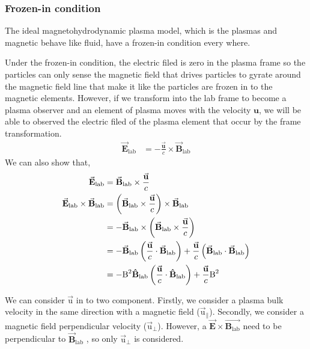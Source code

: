\documentclass[12pt, a4paper]{article}
\DeclareRobustCommand{\uvec}[1]{{%
  \ifcsname uvec#1\endcsname
     \csname uvec#1\endcsname
   \else
    \bm{\hat{\mathbf{#1}}}%
   \fi
}}
\begin{document}
		\subsubsection*{Frozen-in condition}
			The ideal magnetohydrodynamic plasma model, which is the plasmas and magnetic behave like fluid, have a frozen-in condition every where. \par
			Under the frozen-in condition, the electric filed is zero in the plasma frame so the particles can only sense the magnetic field that drives particles to gyrate around the magnetic field line that make it like the particles are frozen in to the magnetic elements. However, if we transform into the lab frame to become a plasma observer and an element of plasma moves with the velocity $\mathbf{u}$, we will be able to observed the electric filed of the plasma element that occur by the frame transformation.
			\begin{align*}
				\vec{\mathbf{E}}_{\text{lab}}&=-\frac{\vec{\mathbf{u}}}{c}\times\vec{\mathbf{B}}_{\text{lab}}
			\end{align*}
			We can also show that,
			\begin{align*}
				\vec{\mathbf{E}}_{\text{lab}}&=\vec{\mathbf{B}}_{\text{lab}}\times\frac{\vec{\mathbf{u}}}{c}\\
				\vec{\mathbf{E}}_{\text{lab}}\times\vec{\mathbf{B}}_{\text{lab}}&=\left( \vec{\mathbf{B}}_{\text{lab}}\times\frac{\vec{\mathbf{u}}}{c}\right) \times\vec{\mathbf{B}}_{\text{lab}}\\
				&=-\vec{\mathbf{B}}_{\text{lab}}\times\left( \vec{\mathbf{B}}_{\text{lab}}\times\frac{\vec{\mathbf{u}}}{c}\right)\\
				&=-\vec{\mathbf{B}}_{\text{lab}}\left( \frac{\vec{\mathbf{u}}}{c}\cdot \vec{\mathbf{B}}_{\text{lab}} \right)+\frac{\vec{\mathbf{u}}}{c}\left( \vec{\mathbf{B}}_{\text{lab}}\cdot\vec{\mathbf{B}}_{\text{lab}} \right)\\
				&=-\text{B}^{2}\uvec{B}_{\text{lab}}\left( \frac{\vec{\mathbf{u}}}{c}\cdot \uvec{B}_{\text{lab}} \right)+\frac{\vec{\mathbf{u}}}{c}\text{B}^2
			\end{align*}
	\par We can consider $\vec{\text{u}}$ in to two component. Firstly, we consider a plasma bulk velocity in the same direction with a magnetic field ($\vec{\text{u}}_\parallel$). Secondly, we consider a magnetic field perpendicular velocity ($\vec{\text{u}}_\perp$). However, a $\vec{\mathbf{E}}\times\vec{\mathbf{B}_{\text{lab}}}$ need to be perpendicular to $\vec{\mathbf{B}}_{\text{lab}}$ , so only $\vec{\text{u}}_\perp$ is considered.
\end{document}
